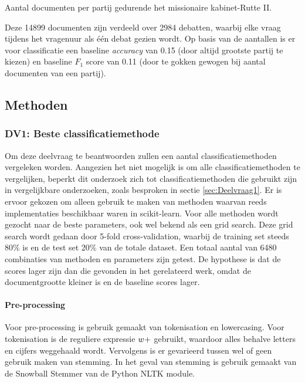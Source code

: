 \begin{table}[H]
\label{aantallen}
\caption{Aantal documenten per partij gedurende het missionaire kabinet-Rutte II.}
\centering

\end{table}
Deze 14899 documenten zijn verdeeld over 2984 debatten, waarbij elke vraag tijdens het vragenuur als één debat gezien wordt. Op basis van de aantallen is er voor classificatie een baseline \textit{accuracy} van 0.15 (door altijd grootste partij te kiezen) en baseline $F_1$ score van 0.11 (door te gokken gewogen bij aantal documenten van een partij).\par


\subsection{Methoden}


\subsubsection{DV1: Beste classificatiemethode}
Om deze deelvraag te beantwoorden zullen een aantal classificatiemethoden vergeleken worden. Aangezien het niet mogelijk is om alle classificatiemethoden te vergelijken, beperkt dit onderzoek zich tot classificatiemethoden die gebruikt zijn in vergelijkbare onderzoeken, zoals besproken in sectie \ref{sec:Deelvraag1}. Er is ervoor gekozen om alleen gebruik te maken van methoden waarvan reeds implementaties beschikbaar waren in scikit-learn. Voor alle methoden wordt gezocht naar de beste parameters, ook wel bekend als een grid search. Deze grid search wordt gedaan door 5-fold cross-validation, waarbij de training set steeds 80\% is en de test set 20\% van de totale dataset. Een totaal aantal van 6480 combinaties van methoden en parameters zijn getest. De hypothese is dat de scores lager zijn dan die gevonden in het gerelateerd werk, omdat de documentgrootte kleiner is en de baseline scores lager.

\paragraph{Pre-processing}
Voor pre-processing is gebruik gemaakt van tokenisation en lowercasing. Voor tokenisation is de reguliere expressie $\\w+$ gebruikt, waardoor alles behalve letters en cijfers weggehaald wordt. Vervolgens is er gevarieerd tussen wel of geen gebruik maken van stemming. In het geval van stemming is gebruik gemaakt van de Snowball Stemmer van de Python NLTK module.

